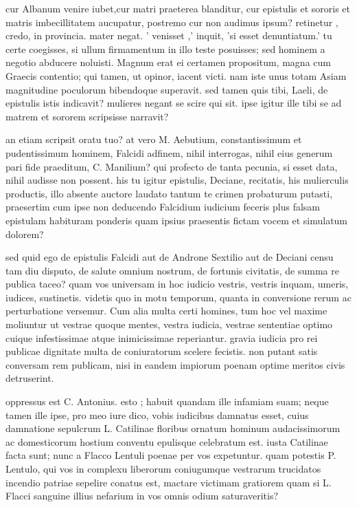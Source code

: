  cur Albanum venire iubet,cur matri praeterea blanditur, cur epistulis et sororis et matris imbecillitatem aucupatur, postremo cur non audimus ipsum? retinetur , credo, in provincia. mater negat. ' venisset ,' inquit, 'si esset denuntiatum.' tu certe coegisses, si ullum firmamentum in illo teste posuisses; sed hominem a negotio abducere noluisti. Magnum erat ei certamen propositum, magna cum Graecis contentio; qui tamen, ut opinor, iacent victi. nam iste unus totam Asiam magnitudine poculorum bibendoque superavit. sed tamen quis tibi, Laeli, de epistulis istis indicavit? mulieres negant se scire qui sit. ipse igitur ille tibi se ad matrem et sororem scripsisse narravit?

 an etiam scripsit oratu tuo? at vero M. Aebutium, constantissimum et pudentissimum hominem, Falcidi adfinem, nihil interrogas, nihil eius generum pari fide praeditum, C. Manilium? qui profecto de tanta pecunia, si esset data, nihil audisse non possent. his tu igitur epistulis, Deciane, recitatis, his mulierculis productis, illo absente auctore laudato tantum te crimen probaturum putasti, praesertim cum ipse non deducendo Falcidium iudicium feceris plus falsam epistulam habituram ponderis quam ipsius praesentis fictam vocem et simulatum dolorem?

 sed quid ego de epistulis Falcidi aut de Androne Sextilio aut de Deciani censu tam diu disputo, de salute omnium nostrum, de fortunis civitatis, de summa re publica taceo? quam vos universam in hoc iudicio vestris, vestris inquam, umeris, iudices, sustinetis. videtis quo in motu temporum, quanta in conversione rerum ac perturbatione versemur. Cum alia multa certi homines, tum hoc vel maxime moliuntur ut vestrae quoque mentes, vestra iudicia, vestrae sententiae optimo cuique infestissimae atque inimicissimae reperiantur. gravia iudicia pro rei publicae dignitate multa de coniuratorum scelere fecistis. non putant satis conversam rem publicam, nisi in eandem impiorum poenam optime meritos civis detruserint.

 oppressus est C. Antonius. esto ; habuit quandam ille infamiam suam; neque tamen ille ipse, pro meo iure dico, vobis iudicibus damnatus esset, cuius damnatione sepulcrum L. Catilinae floribus ornatum hominum audacissimorum ac domesticorum hostium conventu epulisque celebratum est. iusta Catilinae facta sunt; nunc a Flacco Lentuli poenae per vos expetuntur. quam potestis P. Lentulo, qui vos in complexu liberorum coniugumque vestrarum trucidatos incendio patriae sepelire conatus est, mactare victimam gratiorem quam si L. Flacci sanguine illius nefarium in vos omnis odium saturaveritis?

